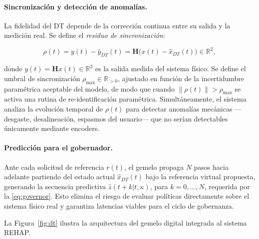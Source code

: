 \documentclass[a4paper,12pt]{article}
\begin{document}
\paragraph{Sincronización y detección de anomalías.}
La fidelidad del DT depende de la corrección continua entre su salida y la medición real. Se define el \textit{residuo de sincronización}:

\begin{equation}
    \rho(t) = y(t) - \hat{y}_{DT}(t) = \mathbf{H}\bigl(x(t)-\hat{x}_{DT}(t)\bigr)\in\mathbb{R}^{2},
    \label{eq:residuo}
\end{equation}

\noindent donde $y(t)=\mathbf{H}x(t)\in\mathbb{R}^{2}$ es la salida medida del sistema físico. Se define el umbral de sincronización $\rho_{\max}\in\mathbb{R}_{>0}$, ajustado en función de la incertidumbre paramétrica aceptable del modelo, de modo que cuando $\|\rho(t)\|>\rho_{\max}$ se activa una rutina de re-identificación paramétrica. Simultáneamente, el sistema analiza la evolución temporal de $\rho(t)$ para detectar anomalías mecánicas —desgaste, desalineación, espasmos del usuario— que no serían detectables únicamente mediante encoders.

\paragraph{Predicción para el gobernador.}
Ante cada solicitud de referencia $r(t)$, el gemelo propaga $N$ pasos hacia adelante partiendo del estado actual $\hat{x}_{DT}(t)$ bajo la referencia virtual propuesta, generando la secuencia predictiva $\hat{z}(t+k|t, \kappa)$, para $k=0,\ldots,N$, requerida por la \cref{eq:governor}. Esto elimina el riesgo de evaluar políticas directamente sobre el sistema físico real y garantiza latencias viables para el ciclo de gobernanza.

La Figura~\ref{fig:dt} ilustra la arquitectura del gemelo digital integrada al sistema REHAP.
\end{document}
